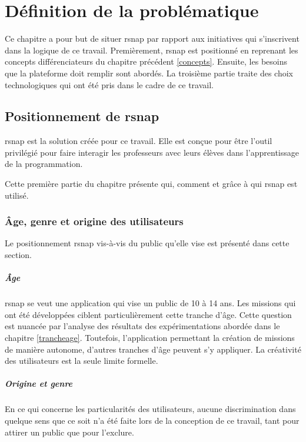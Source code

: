 \chapter{Définition de la problématique}
Ce chapitre a pour but de situer \gls{rsnap} par rapport aux initiatives qui s'inscrivent dans la logique de ce travail. Premièrement, \gls{rsnap} est positionné en reprenant les concepts différenciateurs du chapitre précédent \ref{concepts}. Ensuite, les besoins que la plateforme doit remplir sont abordés. La troisième partie traite des choix technologiques qui ont été pris dans le cadre de ce travail.

\section{Positionnement de \gls{rsnap}}
\label{positionnement}
\gls{rsnap} est la solution créée pour ce travail. Elle est conçue pour être l'outil privilégié pour faire interagir les professeurs avec leurs élèves dans l'apprentissage de la programmation.

Cette première partie du chapitre présente qui, comment et grâce à qui \gls{rsnap} est utilisé.

\subsection{Âge, genre et origine des utilisateurs}
Le positionnement \gls{rsnap} vis-à-vis du public qu'elle vise est présenté dans cette section.

\paragraph{Âge}
\gls{rsnap} se veut une application qui vise un public de 10 à 14 ans. Les \glspl{mission} qui ont été développées ciblent particulièrement cette tranche d'âge. Cette question est nuancée par l'analyse des résultats des expérimentations abordée dans le chapitre \ref{trancheage}.
Toutefois, l'application permettant la création de \glspl{mission} de manière autonome, d'autres tranches d'âge peuvent s'y appliquer. La créativité des utilisateurs est la seule limite formelle.

\paragraph{Origine et genre}
En ce qui concerne les particularités des utilisateurs, aucune discrimination dans quelque sens que ce soit n'a été faite lors de la conception de ce travail, tant pour attirer un public que pour l'exclure.

